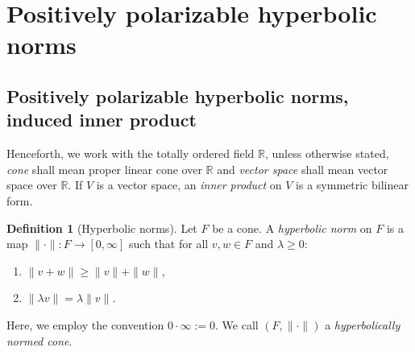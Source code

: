 \documentclass[a4paper,11pt]{article}
\numberwithin{equation}{section}
\theoremstyle{definition}
\newtheorem{Definition}{Definition}[section]
\theoremstyle{plain}
\newtheorem{Corollary}[Definition]{Corollary}
\newcommand{\R}{\mathbb R}
\begin{document}

\section{Positively polarizable hyperbolic norms}\label{Section: Positively polarizable hyperbolic norms}
\subsection{Positively polarizable hyperbolic norms, induced inner product}
Henceforth, we work with the totally ordered field $\R$, unless otherwise stated, \emph{cone} shall mean proper linear cone over $\R$ and \textit{vector space} shall mean vector space over $\R$. If $V$ is a vector space, an \textit{inner product} on $V$ is a symmetric bilinear form.

\begin{Definition}[Hyperbolic norms]
Let $F$ be a cone. A \emph{hyperbolic norm} on $F$ is a map $\|\cdot\|: F \to [0,\infty]$ such that for all $v,w \in F$ and $\lambda \geq 0$:
\begin{enumerate}
    \item $\|v + w\| \geq \|v\| + \|w\|$,
    \item $\|\lambda v\| = \lambda \|v\|$.
\end{enumerate}
Here, we employ the convention $0 \cdot \infty:= 0$. We call $(F,\|\cdot\|)$ a \emph{hyperbolically normed cone}.
\end{Definition}
\end{document}
